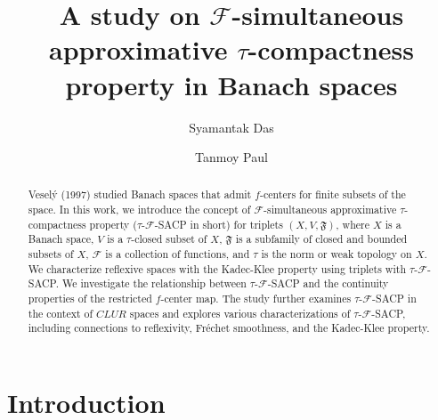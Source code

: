 \documentclass[11pt]{amsart}
\newcommand{\mf}{\mathfrak}
\newcommand{\mr}{\mathscr}
\begin{document}
\title[$\mr{F}$-simultaneous approximative $\tau$-compactness in Banach spaces]{A study on $\mr{F}$-simultaneous approximative $\tau$-compactness property in Banach spaces}
\author[Das]{Syamantak Das}
\author[Paul]{Tanmoy Paul}
\address{Dept. of Mathematics\\
Indian Institute of Technology, Hyderabad\\
India}
\begin{abstract}
Vesel\'y  (1997) studied Banach spaces that admit $f$-centers for finite subsets of the space. In this work, we introduce the concept of $\mr{F}$-simultaneous approximative $\tau$-compactness property ($\tau$-$\mr{F}$-SACP in short) for triplets $(X, V,\mf{F})$, where $X$ is a Banach space, $V$ is a $\tau$-closed subset of $X$, $\mf{F}$ is a subfamily of closed and bounded subsets of $X$, $\mr{F}$ is a collection of functions, and $\tau$ is the norm or weak topology on $X$.  We characterize reflexive spaces with the Kadec-Klee property using triplets with $\tau$-$\mr{F}$-SACP.  We investigate the relationship between $\tau$-$\mr{F}$-SACP and the continuity properties of the restricted $f$-center map. The study further examines  $\tau$-$\mr{F}$-SACP in the context of $CLUR$ spaces and explores various characterizations of $\tau$-$\mr{F}$-SACP, including connections to reflexivity, Fr\'echet smoothness, and the Kadec-Klee property. 
\end{abstract}
\maketitle
\section{Introduction}
\end{document}
